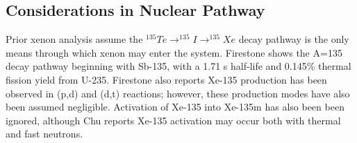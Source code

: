 \subsection{Considerations in Nuclear Pathway}
Prior xenon analysis assume the $^{135}Te \rightarrow ^{135}I \rightarrow ^{135}Xe$ decay pathway is the only means through which xenon may enter the system.  Firestone shows the A=135 decay pathway beginning with Sb-135, with a 1.71 s half-life and 0.145\% thermal fission yield from U-235. \cite{Firestone96} Firestone also reports Xe-135 production has been observed in (p,d) and (d,t) reactions; however, these production modes have also been assumed negligible.  Activation of Xe-135 into Xe-135m has also been been ignored, although Chu reports Xe-135 activation may occur both with thermal and fast neutrons. \cite{Chu1999}